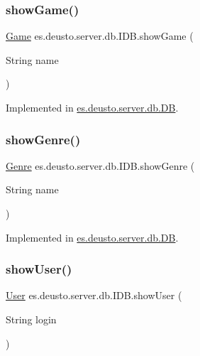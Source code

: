 \subsubsection{\texorpdfstring{show\+Game()}{showGame()}}
{\footnotesize\ttfamily \hyperlink{classes_1_1deusto_1_1server_1_1db_1_1data_1_1_game}{Game} es.\+deusto.\+server.\+db.\+I\+D\+B.\+show\+Game (\begin{DoxyParamCaption}\item[{String}]{name }\end{DoxyParamCaption})}



Implemented in \hyperlink{classes_1_1deusto_1_1server_1_1db_1_1_d_b_adba76c20f2fc7ed01d486564d881a718}{es.\+deusto.\+server.\+db.\+DB}.

\mbox{\label{interfacees_1_1deusto_1_1server_1_1db_1_1_i_d_b_a9023bdad77781d95fc2e556d1935f763}} 
\subsubsection{\texorpdfstring{show\+Genre()}{showGenre()}}
{\footnotesize\ttfamily \hyperlink{classes_1_1deusto_1_1server_1_1db_1_1data_1_1_genre}{Genre} es.\+deusto.\+server.\+db.\+I\+D\+B.\+show\+Genre (\begin{DoxyParamCaption}\item[{String}]{name }\end{DoxyParamCaption})}



Implemented in \hyperlink{classes_1_1deusto_1_1server_1_1db_1_1_d_b_a207ddeb183db925dc20f095033aa4d94}{es.\+deusto.\+server.\+db.\+DB}.

\mbox{\label{interfacees_1_1deusto_1_1server_1_1db_1_1_i_d_b_aa2f6a5291fa8aa78d5a73b5878d17986}} 
\subsubsection{\texorpdfstring{show\+User()}{showUser()}}
{\footnotesize\ttfamily \hyperlink{classes_1_1deusto_1_1server_1_1db_1_1data_1_1_user}{User} es.\+deusto.\+server.\+db.\+I\+D\+B.\+show\+User (\begin{DoxyParamCaption}\item[{String}]{login }\end{DoxyParamCaption})}



